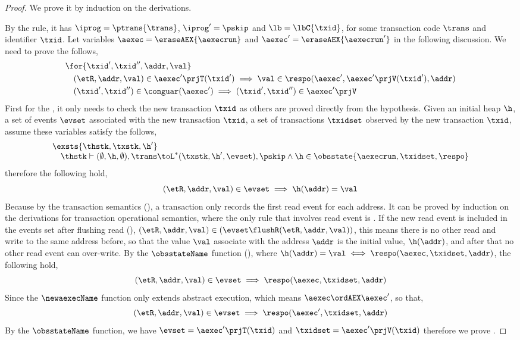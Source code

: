 \begin{proof}
We prove it by induction on the derivations.


By the  rule, it has \( \iprog = \ptrans{\trans} \), \( \iprog' = \pskip \) and \( \lb = \lbC{\txid} \), for some transaction code \( \trans \) and identifier \( \txid \).
Let variables \( \aexec = \eraseAEX{\aexecrun} \) and \( \aexec' = \eraseAEX{\aexecrun'} \) in the following discussion.
We need to prove the follows,
\begin{align}
    & \for{ \txid', \txid'', \addr, \val}  \nonumber \\
    & \quad (\etR, \addr, \val) \in \aexec'\prjT(\txid') \implies \val \in \respo(\aexec',\aexec'\prjV(\txid'), \addr) \label{equ:res_policy}\\
    & \quad (\txid', \txid'') \in \conguar(\aexec') \implies (\txid', \txid'') \in \aexec'\prjV \label{equ:con_guarantee}
\end{align}
First for the , it only needs to check the new transaction \( \txid \) as others are proved directly from the hypothesis.
Given an initial heap \( \h \), a set of events \( \evset \) associated with the new transaction \( \txid \), a set of transactions \( \txidset \) observed by the new transaction \( \txid \), assume these variables satisfy the follows,
\[
\begin{array}{@{}l@{}}
    \exsts{\thstk, \txstk, \h'} \nonumber \\
    \quad \thstk \vdash (\emptyset, \h, \emptyset), \trans \toL^{*} (\txstk, \h', \evset), \pskip 
    \land \h \in \obsstate{\aexecrun, \txidset, \respo} \nonumber \\
\end{array}
\]
therefore the following hold,
\[
    (\etR, \addr, \val) \in \evset \implies \h(\addr) = \val
\]
Because by the transaction semantics (), a transaction only records the first read event for each address.
It can be proved by induction on the derivations for transaction operational semantics, where the only rule that involves read event is .
If the new read event is included in the events set after flushing read (), \ie \( (\etR, \addr, \val) \in ( \evset \flushR (\etR, \addr, \val) ) \), this means there is no other read and write to the same address before, so that the value \( \val  \) associate with the address \( \addr \) is the initial value, \ie \( \h(\addr)\), and after that no other read event can over-write.
By the \( \obsstateName \) function (), where \( \h(\addr) = \val \iff \respo(\aexec, \txidset, \addr) \), the following hold,
\[
    (\etR, \addr, \val) \in \evset \implies \respo(\aexec, \txidset, \addr)
\]
Since the \( \newaexecName \) function only extends abstract execution, which means \( \aexec \ordAEX \aexec' \), so that,
\[
    (\etR, \addr, \val) \in \evset \implies \respo(\aexec', \txidset, \addr)
\]
By the \( \obsstateName \) function, we have \( \evset = \aexec'\prjT(\txid)\) and \( \txidset = \aexec'\prjV(\txid)\) therefore we prove .


\end{proof}
